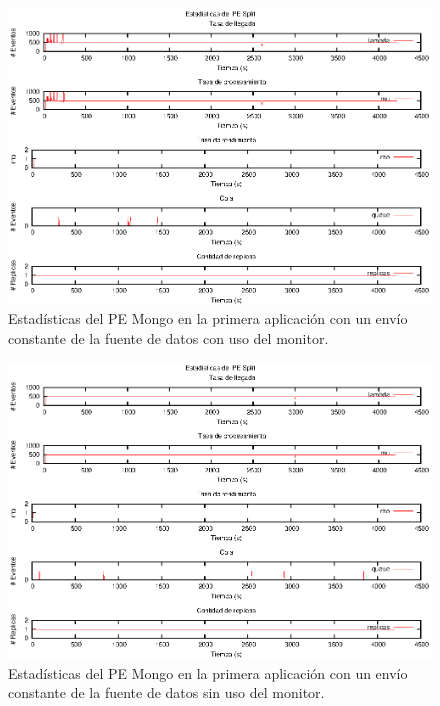 \begin{figure}[p]
\centering
    \includegraphics[scale=1.1]{images/exp/app2/uniform/cm/statusSplitPE.eps}
    \caption{Estadísticas del PE Mongo en la primera aplicación con un envío constante de la fuente de datos con uso del monitor.}
    \label{fig:app2-uniform-statusSplitPE-cm}
\end{figure}

\begin{figure}[p]
\centering
    \includegraphics[scale=1.1]{images/exp/app2/uniform/sm/statusSplitPE.eps}
    \caption{Estadísticas del PE Mongo en la primera aplicación con un envío constante de la fuente de datos sin uso del monitor.}
    \label{fig:app2-uniform-statusSplitPE-sm}
\end{figure}

